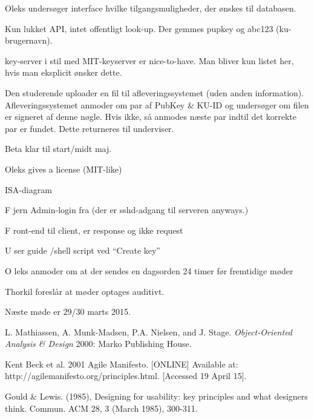 \documentclass[11pt,a4paper]{report}
\let\OldItem\item
\newcommand{\SubItemStart}[1]{%
    \let\item\SubItemEnd
    \begin{SubItemList}[resume]%
        \OldItem #1%
}
\newcommand{\SubItemMiddle}[1]{%
    \OldItem #1%
}
\newcommand{\SubItemEnd}[1]{%
    \end{SubItemList}%
    \let\item\OldItem
    \item #1%
}
\newcommand*{\SubItem}[1]{%
    \let\SubItem\SubItemMiddle%
    \SubItemStart{#1}%
}%
\begin{document}
\begin{itemize}
\item Oleks undersøger interface hvilke tilgangsmuligheder, der ønskes til databasen.
\item Kun lukket API, intet offentligt look-up. Der gemmes pupkey og abc123 (ku-brugernavn).
\item key-server i stil med MIT-keyserver er nice-to-have. Man bliver kun listet her, hvis man eksplicit ønsker dette.
\item Den studerende uploader en fil til afleveringssystemet (uden anden information). Afleveringssystemet anmoder om par af PubKey \& KU-ID og undersøger om filen er signeret af denne nøgle. Hvis ikke, så anmodes næste par indtil det korrekte par er fundet. Dette returneres til underviser.
\item Beta klar til start/midt maj.
\item Oleks gives a license (MIT-like)
\item ISA-diagram
\SubItem Fjern Admin-login fra (der er sshd-adgang til serveren anyways.)
\SubItem Front-end til client, er response og ikke request
\SubItem User guide /shell script ved ``Create key''
\item Oleks anmoder om at der sendes en dagsorden 24 timer før fremtidige møder
\item Thorkil foreslår at møder optages auditivt.
\end{itemize}

Næste møde er 29/30 marts 2015.

\begin{thebibliography}{1}

 L. Mathiassen, A. Munk-Madsen, P.A. Nielsen, and J. Stage. {\em Object-Oriented Analysis \& Design} 2000: Marko Publishing House.

 Kent Beck et al. 2001 Agile Manifesto. [ONLINE] Available at: http://agilemanifesto.org/principles.html. [Accessed 19 April 15].

 Gould \& Lewis. (1985), Designing for usability: key principles and what designers think. Commun. ACM 28, 3 (March 1985), 300-311.




\end{thebibliography}
\end{document}

